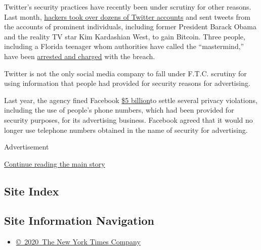 Twitter's security practices have recently been under scrutiny for other
reasons. Last month,
\href{https://www.nytimes3xbfgragh.onion/2020/07/15/technology/twitter-hack-bill-gates-elon-musk.html}{hackers
took over dozens of Twitter accounts} and sent tweets from the accounts
of prominent individuals, including former President Barack Obama and
the reality TV star Kim Kardashian West, to gain Bitcoin. Three people,
including a Florida teenager whom authorities have called the
``mastermind,'' have been
\href{https://www.nytimes3xbfgragh.onion/2020/07/31/technology/twitter-hack-arrest.html}{arrested
and charged} with the breach.

Twitter is not the only social media company to fall under F.T.C.
scrutiny for using information that people had provided for security
reasons for advertising.

Last year, the agency fined Facebook
\href{https://www.ftc.gov/news-events/press-releases/2019/07/ftc-imposes-5-billion-penalty-sweeping-new-privacy-restrictions}{\$5
billion}to settle several privacy violations, including the use of
people's phone numbers, which had been provided for security purposes,
for its advertising business. Facebook agreed that it would no longer
use telephone numbers obtained in the name of security for advertising.

Advertisement

\protect\hyperlink{after-bottom}{Continue reading the main story}

\hypertarget{site-index}{%
\subsection{Site Index}\label{site-index}}

\hypertarget{site-information-navigation}{%
\subsection{Site Information
Navigation}\label{site-information-navigation}}

\begin{itemize}
\tightlist
\item
  \href{https://help.nytimes3xbfgragh.onion/hc/en-us/articles/115014792127-Copyright-notice}{©~2020~The
  New York Times Company}
\end{itemize}

